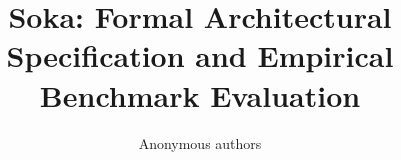\title{\textbf{Soka: Formal Architectural Specification and Empirical Benchmark Evaluation}}

\author{Anonymous authors}
